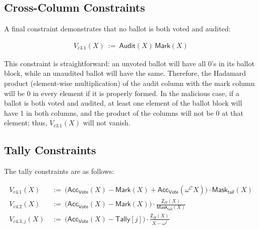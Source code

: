 \subsection{Cross-Column Constraints}


A final constraint demonstrates that no ballot is both voted and audited:

\begin{mdframed}[linewidth=0.6pt,backgroundcolor=verylightpink,innerleftmargin=6pt,innerrightmargin=6pt,innertopmargin=4pt,innerbottommargin=4pt]
\[
\begin{aligned}
V_{c3.1}(X)\ :=\ \mathsf{Audit}(X)\,\mathsf{Mark}(X)
\end{aligned}
\]
\end{mdframed}

\noindent This constraint is straightforward: an unvoted ballot will have all 0's in its ballot block, while an unaudited ballot will have the same. Therefore, the Hadamard product (element-wise multiplication) of the audit column with the mark column will be 0 in every element if it is properly formed. In the malicious case, if a ballot is both voted and audited, at least one element of the ballot block will have 1 in both columns, and the product of the columns will not be 0 at that element; thus, $V_{c3.1}(X)$ will not vanish.


\subsection{Tally Constraints}
\label{sec:tally}

The tally constraints are as follows:

\begin{mdframed}[linewidth=0.6pt,backgroundcolor=verylightpink,innerleftmargin=6pt,innerrightmargin=6pt,innertopmargin=4pt,innerbottommargin=4pt]
\[
\begin{aligned}
V_{c4.1}(X)\ &:=\ \bigl(\mathsf{Acc}_{\mathsf{Vote}}(X)-\mathsf{Mark}(X)+\mathsf{Acc}_{\mathsf{Vote}}(\omega^{\mathcal{C}}X)\bigr)\cdot \mathsf{Mask}_{\mathsf{tail}}(X) \\
V_{c4.2}(X)\ &:=\ \bigl(\mathsf{Acc}_{\mathsf{Vote}}(X)-\mathsf{Mark}(X)\bigr)\cdot \frac{\mathsf{Z}_H(X)}{\mathsf{Mask}_{\mathsf{tail}}(X)}\\
V_{c4.3,j}(X)\ &:=\ \bigl(\mathsf{Acc}_{\mathsf{Vote}}(X)-\mathsf{Tally}[j]\bigr)\cdot \frac{\mathsf{Z}_H(X)}{X-\omega^{j}}
\end{aligned}
\]
\end{mdframed}

